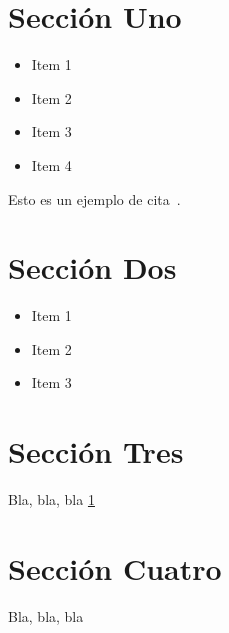 
\section{Sección Uno}
\label{1:sec:1}

\begin{itemize}
  \item Item 1
  \item Item 2
  \item Item 3
  \item Item 4
\end{itemize}

Esto es un ejemplo de cita~\cite{Segredo:2017}.

\section{Sección Dos}
\label{1:sec:2}

\begin{itemize}
  \item Item 1
  \item Item 2
  \item Item 3
\end{itemize}

\section{Sección Tres}
\label{1:sec:3}

Bla, bla, bla  \ref{1:sec:1}

\section{Sección Cuatro}
\label{1:sec:4}

Bla, bla, bla

